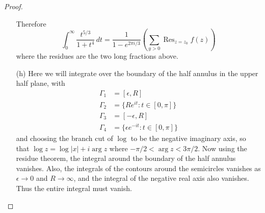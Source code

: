 \documentclass{article}
\begin{document}
\begin{proof}
\begin{enumerate}
\[      \]
      Therefore \[
        \int_0^\infty \frac{t^{5/3}}{1 + t^4}\,dt = \frac{1}{1 - e^{2\pi i/3}}\left(
          \sum_{y > 0} \operatorname{Res}_{z=z_0} f(z)
        \right)
      \] where the residues are the two long fractions above.
    \item[(h)]
      Here we will integrate over the boundary of the half annulus in the upper
      half plane, with \begin{align}
        \Gamma_1 &= [\epsilon, R]\\
        \Gamma_2 &= \{Re^{it}: t \in [0, \pi]\}\\
        \Gamma_3 &= [-\epsilon, R]\\
        \Gamma_4 &= \{\epsilon e^{-it}: t \in [0, \pi]\}
      \end{align}
      and choosing the branch cut of $\log$ to be the negative imaginary axis,
      so that $\log z = \log |x| + i\arg z$ where $-\pi/2 < \arg z < 3\pi/2$.
      Now using the residue theorem, the integral around the boundary of the
      half annulus vanishes.
      Also, the integrals of the contours around the semicircles vanishes as
      $\epsilon \rightarrow 0$ and $R \rightarrow \infty$, and the integral of
      the negative real axis also vanishes. Thus the entire integral must vanish.
  \end{enumerate}
\end{proof}
\end{document}
